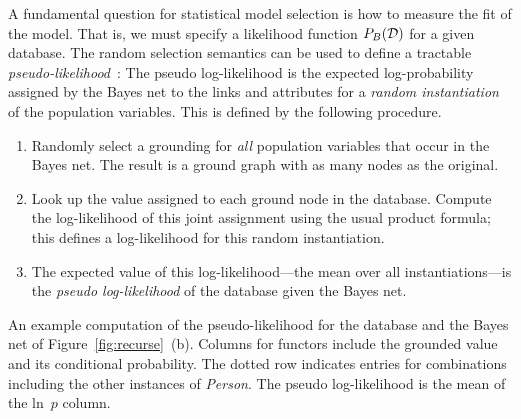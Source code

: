\documentclass[oribibl]{llncs}
\begin{document}
A fundamental question for statistical model selection is how to measure the fit of the model. That is, we must specify a likelihood function $P_{B}(\mathcal{D})$ for a given database. 
The random selection semantics can be used to define a tractable {\em pseudo-likelihood}~\cite{Schulte2011}: The pseudo log-likelihood is the expected log-probability assigned by the Bayes net to the links and attributes for a {\em random instantiation} of the population variables. This is defined by the following procedure.

\begin{enumerate}
\item Randomly select a grounding for {\em all} population variables that occur in the Bayes net. The result is a ground graph with as many nodes as the original.
\item Look up the value assigned to each ground node in the database.
Compute the log-likelihood of this joint assignment using the usual product formula; this defines a log-likelihood for this random instantiation. 
\item The expected value of this log-likelihood---the mean over all instantiations---is the {\em pseudo log-likelihood}  of the database given the Bayes net. 
\end{enumerate}



\begin{table}[tb]
\caption{An example computation of the pseudo-likelihood for the database  and the Bayes net of Figure~\ref{fig:recurse}~(b). Columns for functors include the grounded value and its conditional probability.  The dotted row indicates entries for combinations including the other instances of {\em Person}. The pseudo log-likelihood is the mean of the ln~$p$ column.}
\begin{center}

\end{center}
\label{table:entity-join}
\end{table}
\end{document}
